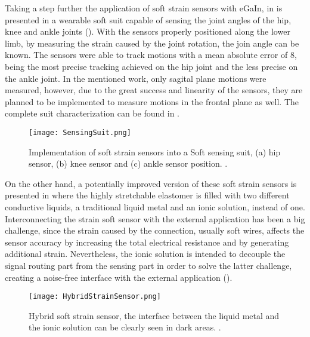 Taking a step further the application of soft strain sensors with eGaIn, in \cite{mengucc2013soft} is presented in a wearable soft suit capable of sensing the joint angles of the hip, knee and ankle joints (). With the sensors properly positioned along the lower limb, by measuring the strain caused by the joint rotation, the join angle can be known. The sensors were able to track motions with a mean absolute error of 8\textdegree{}, being the most precise tracking achieved on the hip joint and the less precise on the ankle joint. In the mentioned work, only sagital plane motions were measured, however, due to the great success and linearity of the sensors, they are planned to be implemented to measure motions in the frontal plane as well. The complete suit characterization can be found in \cite{mengucc2014wearable}.

\begin{figure}[hbtp!]
    \centering
    \texttt{[image: SensingSuit.png]}
    \caption{Implementation of soft strain sensors into a Soft sensing suit, (a) hip sensor, (b) knee sensor and (c) ankle sensor position. \cite{mengucc2013soft}. }
    \label{fig:Sensing_suit}
\end{figure}

On the other hand, a potentially improved version of these soft strain sensors is presented in \cite{Chossat2013} where the highly stretchable elastomer is filled with two different conductive liquids, a traditional liquid metal and an ionic solution, instead of one. Interconnecting the strain soft sensor with the external application has been a big challenge, since the strain caused by the connection, usually soft wires, affects the sensor accuracy by increasing the total electrical resistance and by generating additional strain. Nevertheless, the ionic solution is intended to decouple the signal routing part from the sensing part in order to solve the latter challenge, creating a noise-free interface with the external application ().

\begin{figure}[hbtp!]
    \centering
    \texttt{[image: HybridStrainSensor.png]}
    \caption{Hybrid soft strain sensor, the interface between the liquid metal and the ionic solution can be clearly seen in dark areas. \cite{Chossat2013}. }
    \label{fig:hybrid_strain_sensor}
\end{figure}

